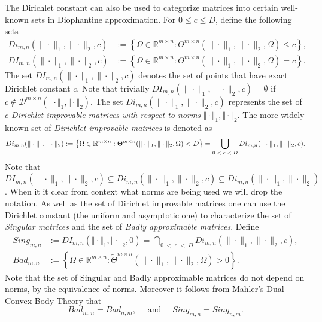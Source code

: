 \documentclass[10pt]{amsart}
\theoremstyle{definition}
\newcommand{\R}{\mathbb{R}}
\begin{document}
The Dirichlet constant can also be used to categorize matrices into certain well-known sets in Diophantine approximation. For $0\le c\le D$, define the following sets
\begin{align*}
    Di_{m,n}(\|\cdot\|_{1},\|\cdot\|_{2},c)&:=\left\{ \Omega \in \R^{m\times n} : \Theta^{m\times n}(\|\cdot\|_{1},\|\cdot\|_{2},\Omega)\leq c \right\}, \\
    DI_{m,n}(\|\cdot\|_{1},\|\cdot\|_{2},c)&:=\left\{ \Omega \in \R^{m\times n} : \Theta^{m\times n}(\|\cdot\|_{1},\|\cdot\|_{2},\Omega)= c \right\}.
\end{align*}
The set $DI_{m,n}(\|\cdot\|_{1},\|\cdot\|_{2},c)$ denotes the set of points that have exact Dirichlet constant $c$. Note that trivially $DI_{m,n}(\|\cdot\|_{1},\|\cdot\|_{2},c)=\emptyset$ if $c \not\in \mathcal{D}^{m\times n}(\Vert\cdot\Vert_1,\Vert\cdot\Vert_2)$. The set $Di_{m,n}(\|\cdot\|_{1},\|\cdot\|_{2},c)$ represents the set of $c$\textit{-Dirichlet improvable matrices with respect to norms} $\Vert\cdot\Vert_{1},\Vert\cdot\Vert_{2}$. The more widely known set of \textit{Dirichlet improvable matrices} is denoted as
\begin{equation*}
    Di_{m,n}(\|\cdot\|_{1},\|\cdot\|_{2}):=\left\{ \Omega \in \R^{m\times n} : \Theta^{m\times n}(\|\cdot\|_{1},\|\cdot\|_{2},\Omega)< D \right\}=\bigcup_{0\;<\;c\;<\;D}Di_{m,n}(\|\cdot\|_{1},\|\cdot\|_{2},c).  \\
\end{equation*}
Note that $DI_{m,n}(\|\cdot\|_{1},\|\cdot\|_{2},c)\subseteq Di_{m,n}(\|\cdot\|_{1},\|\cdot\|_{2},c) \subseteq Di_{m,n}(\|\cdot\|_{1},\|\cdot\|_{2})$. When it it clear from context what norms are being used we will drop the notation. As well as the set of Dirichlet improvable matrices one can use the Dirichlet constant (the uniform and asymptotic one) to characterize the set of \textit{Singular matrices} and the set of \textit{Badly approximable matrices}. Define
\begin{align*}
    Sing_{m,n}&:=DI_{m,n}(\Vert\cdot\Vert_{1},\Vert\cdot\Vert_{2},0)=\bigcap_{0\;<\;c\;<\;D} Di_{m,n}(\|\cdot\|_{1},\|\cdot\|_{2},c),\\
    Bad_{m,n}&:=\left\{ \Omega \in \R^{m\times n} : \widetilde{\Theta}^{m\times n}(\|\cdot\|_{1},\|\cdot\|_{2},\Omega)> 0 \right\}.
\end{align*}
 Note that the set of Singular and Badly approximable matrices do not depend on norms, by the equivalence of norms. Moreover it follows from Mahler's Dual Convex Body Theory that
 \[
 Bad_{m,n}=Bad_{n,m}, \quad \text{ and } \quad Sing_{m,n}=Sing_{n,m}.
 \] 
\end{document}
